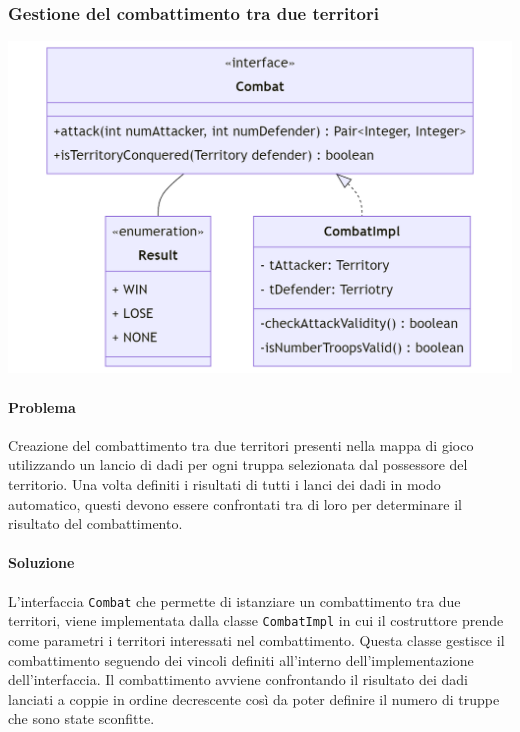 \documentclass[a4paper,12pt]{report}
\begin{document}
\subsubsection{Gestione del combattimento tra due territori}
%
\includegraphics[width=\textwidth]{img/Combat.png}
%
\paragraph{Problema} Creazione del combattimento tra due territori presenti nella mappa di gioco utilizzando un lancio di dadi per ogni truppa selezionata dal possessore del territorio. Una volta definiti i risultati di tutti i lanci dei dadi in modo automatico, questi devono essere confrontati tra di loro per determinare il risultato del combattimento. 
%
\paragraph{Soluzione} L'interfaccia \texttt{Combat} che permette di istanziare un combattimento tra due territori, viene implementata dalla classe \texttt{CombatImpl} in cui il costruttore prende come parametri i territori interessati nel combattimento. Questa classe gestisce il combattimento seguendo dei vincoli definiti all'interno dell'implementazione dell'interfaccia. Il combattimento avviene confrontando il risultato dei dadi lanciati a coppie in ordine decrescente cos\`i da poter definire il numero di truppe che sono state sconfitte.
%
\end{document}
